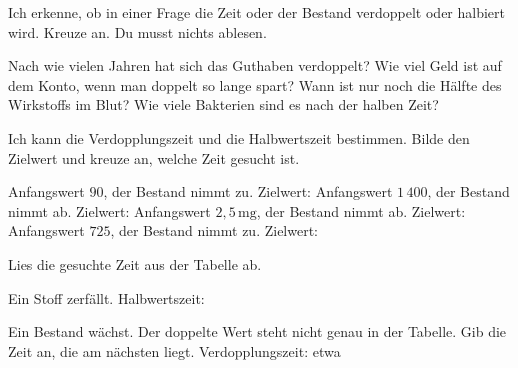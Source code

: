 \setcounter{aufgabe}{35}
\hypertarget{e4}{}

\begin{aufgabe}{Ich erkenne, ob in einer Frage die Zeit oder der Bestand verdoppelt oder halbiert wird. Kreuze an. Du musst nichts ablesen.}
\begin{teile}
\teil Nach wie vielen Jahren hat sich das Guthaben verdoppelt? \hfill {}
\teil Wie viel Geld ist auf dem Konto, wenn man doppelt so lange spart? \hfill {}
\teil Wann ist nur noch die Hälfte des Wirkstoffs im Blut? \hfill {}
\teil Wie viele Bakterien sind es nach der halben Zeit? \hfill {}
\end{teile}
\end{aufgabe}

\begin{aufgabe}{Ich kann die Verdopplungszeit und die Halbwertszeit bestimmen. Bilde den Zielwert und kreuze an, welche Zeit gesucht ist.}
\begin{teile}
\teil Anfangswert $90$, der Bestand nimmt zu. \hfill Zielwert: \leerfeld {}
\teil Anfangswert $1\,400$, der Bestand nimmt ab. \hfill Zielwert: \leerfeld {}
\teil Anfangswert $2{,}5\,\text{mg}$, der Bestand nimmt ab. \hfill Zielwert: \leerfeld {}
\teil Anfangswert $725$, der Bestand nimmt zu. \hfill Zielwert: \leerfeld {}
\end{teile}
Lies die gesuchte Zeit aus der Tabelle ab.
\begin{teile}
\teil Ein Stoff zerfällt. \hfill Halbwertszeit: \leerfeld[Tage]
\end{teile}
\begin{teile}
\teil Ein Bestand wächst. Der doppelte Wert steht nicht genau in der Tabelle. Gib die Zeit an, die am nächsten liegt. \hfill Verdopplungszeit: etwa \leerfeld[Jahre]
\end{teile}
\end{aufgabe}

